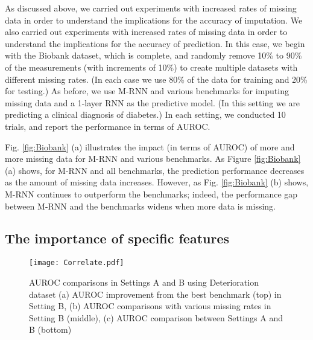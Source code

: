 \documentclass{article}
\begin{document}
As discussed above, we carried out  experiments with increased rates of missing data in order to understand the implications for the accuracy of imputation.  We also carried out  experiments with increased rates of missing data in order to understand the implications for the accuracy of prediction.  In this case, we begin with the Biobank dataset, which is complete, and randomly remove 10\% to 90\% of the measurements (with increments of 10\%) to create multiple datasets with different missing rates. (In each case we use 80\% of the data for training and 20\% for testing.)  As before, we use M-RNN and various benchmarks for imputing missing data and  a 1-layer RNN as the predictive model.  (In this setting we are predicting a clinical diagnosis of diabetes.)  In each setting, we conducted 10 trials, and report the performance  in terms of AUROC. 

Fig. \ref{fig:Biobank} (a) illustrates the impact (in terms of AUROC) of more and more missing data for M-RNN and various benchmarks. As Figure \ref{fig:Biobank} (a) shows, for M-RNN and all benchmarks, the prediction performance decreases as the amount of missing data increases.  However, as Fig. \ref{fig:Biobank} (b) shows, M-RNN continues to outperform the benchmarks; indeed, the performance gap between M-RNN and the benchmarks widens when more data is missing.  

\subsection{The importance of specific features}

\begin{figure}[t!]
	\centering
	\texttt{[image: Correlate.pdf]}
	\caption{AUROC comparisons in Settings A and B using Deterioration dataset (a) AUROC improvement from the best benchmark (top) in Setting B, (b) AUROC comparisons with various missing rates in Setting B (middle), (c) AUROC comparison between Settings A and B (bottom)}
	\label{fig:correlate}
\end{figure} 
\end{document}

